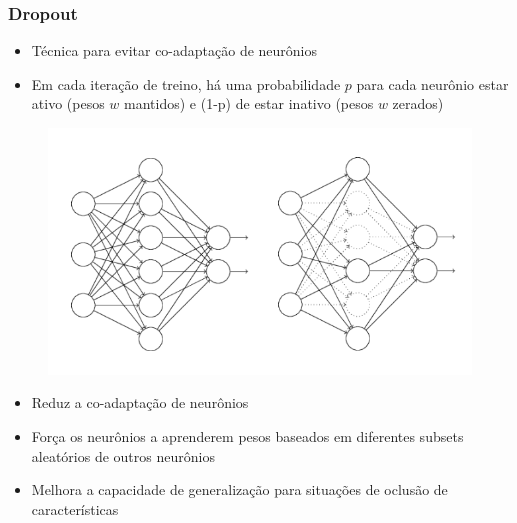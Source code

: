 \documentclass[tikz,10pt]{beamer}
\begin{document}
\begin{frame}
	\frametitle{Dropout}
	
	\begin{itemize}
		\item Técnica para evitar co-adaptação de neurônios
		\item Em cada iteração de treino, há uma probabilidade $p$ para cada neurônio estar ativo (pesos $w$ mantidos) e (1-p) de estar inativo (pesos $w$ zerados)
	\end{itemize}
	
	\begin{figure}
		\centering
		\includegraphics[scale=0.28]{dropout.png}
	\end{figure}
	
	
	\begin{itemize}
		\item Reduz a co-adaptação de neurônios
		\item Força os neurônios a aprenderem pesos baseados em diferentes subsets aleatórios de outros neurônios
		\item Melhora a capacidade de generalização para situações de oclusão de características
	\end{itemize}
	
\end{frame}
\end{document}
